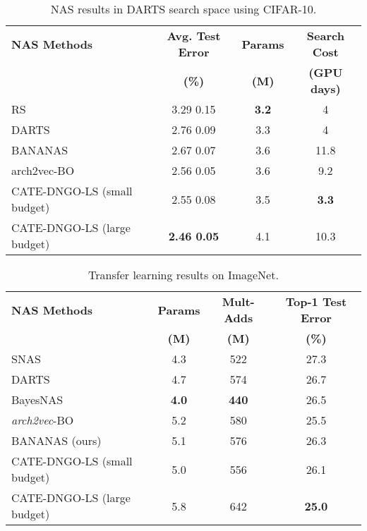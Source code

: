 \begin{table}[t]
\centering
\begin{adjustbox}{width=1.0\columnwidth}
{\small
\begin{tabular}{@{}l|c|c|c@{}}
\toprule
\multicolumn{1}{l}{\textbf{NAS Methods}} & \multicolumn{1}{c}{\textbf{Avg. Test Error}} & \multicolumn{1}{c}{\textbf{Params}} & \multicolumn{1}{c}{\textbf{Search Cost}}\\
\multicolumn{1}{l}{\textbf{}} & \multicolumn{1}{c}{\textbf{(\%)}} & \multicolumn{1}{c}{\textbf{(M)}} & \multicolumn{1}{c}{\textbf{(GPU days)}}\\
\midrule 
RS \cite{Li2019RandomSA}  & 3.29  0.15 & \textbf{3.2} & 4  \\ 
DARTS \cite{liu2018darts}  & 2.76  0.09 & 3.3 & 4  \\ 
BANANAS \cite{white2019bananas}  & 2.67  0.07 & 3.6 & 11.8 \\ 
arch2vec-BO \cite{yan2020arch} & 2.56  0.05 & 3.6 & 9.2 \\
\midrule
CATE-DNGO-LS (small budget) & 2.55  0.08 & 3.5 &  \textbf{3.3} \\
CATE-DNGO-LS (large budget) & \textbf{2.46  0.05} & 4.1 &  10.3 \\ 
\bottomrule
\end{tabular}
}
\end{adjustbox}
\caption{NAS results in DARTS search space using CIFAR-10.}
\label{table:cifar10-comparison}
\end{table}


\begin{table}[t]
\centering
\begin{adjustbox}{width=1.0\columnwidth}
{\small
\begin{tabular}{@{}l|c|c|c@{}}
\toprule
\multicolumn{1}{l}{\textbf{NAS Methods}} & \multicolumn{1}{c}{\textbf{Params}} & \multicolumn{1}{c}{\textbf{Mult-Adds}} & \multicolumn{1}{c}{\textbf{Top-1 Test Error}}\\
\multicolumn{1}{l}{\textbf{}} & 
\multicolumn{1}{c}{\textbf{(M)}} & \multicolumn{1}{c}{\textbf{(M)}} & \multicolumn{1}{c}{\textbf{(\%)}}\\
\midrule 
SNAS \cite{Xie2018SNAS}  & 4.3 & 522 & 27.3  \\ 
DARTS \cite{liu2018darts} & 4.7 & 574 & 26.7 \\
BayesNAS \cite{pmlr-v97-zhou19e} & \textbf{4.0} & \textbf{440} & 26.5 \\
\textit{arch2vec}-BO \cite{yan2020arch} & 5.2 & 580 & 25.5  \\ 
BANANAS (ours) & 5.1 & 576 & 26.3  \\
\midrule
CATE-DNGO-LS (small budget) & 5.0 & 556 & 26.1 \\  
CATE-DNGO-LS (large budget) & 5.8 & 642 & \textbf{25.0} \\  
\bottomrule
\end{tabular}
}
\end{adjustbox}
\caption{Transfer learning results on ImageNet.}
\label{table:imagenet-comparison}
\end{table}









